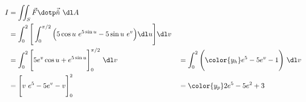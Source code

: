 \begin{enumerate}
          \begin{align}
              I       & = \iint_S \vec{F} \dotp \vec{\hat{n}}\ \dl A   \\
                      & = \int_{0}^{2}
              \Bigg[\int_{0}^{\pi/2} \Big( 5\cos u\ e^{5\sin u} - 5 \sin u\ e^{v} \Big)
              \dl u \Bigg] \dl v                                       \\
                      & = \int_{0}^{2} \Bigg[
                  5e^{v} \cos u + e^{5\sin u} \Bigg]_0^{\pi/2}
              \ \dl v &
                      & = \int_{0}^{2}
              \Bigg( {\color{y_h} e^5 - 5e^{v} - 1} \Bigg)\ \dl v      \\
                      & = \Bigg[ v\ e^5 - 5e^{v} - v \Bigg]_{0}^{2}  &
                      & = \color{y_p} 2e^5 - 5e^{2} + 3
          \end{align}


\end{enumerate}
